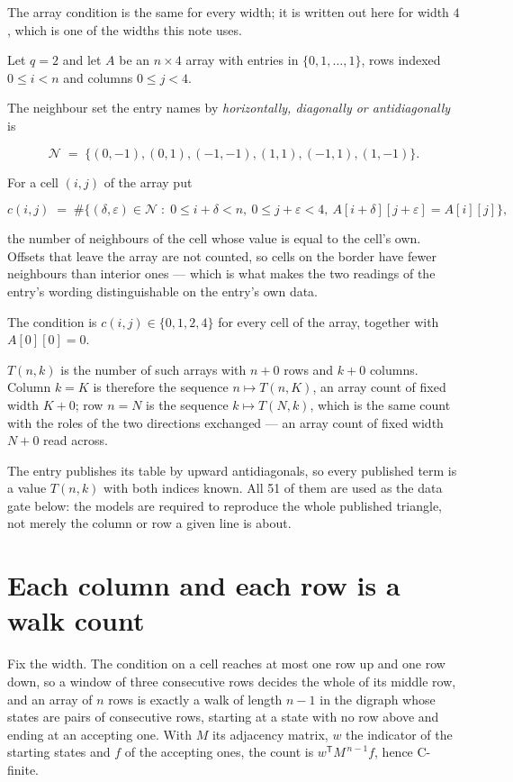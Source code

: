 \documentclass[11pt]{article}
\theoremstyle{definition}
\begin{document}
The array condition is the same for every width; it is written out here for width $4$, which is one of the widths this note uses.

Let $q = 2$ and let $A$ be an $n \times 4$ array with entries in $\{0,1,\dots,1\}$, rows indexed $0 \le i < n$ and columns $0 \le j < 4$.

The neighbour set the entry names by {\itshape horizontally, diagonally or antidiagonally} is

\[\mathcal{N} \;=\; \{(0,-1), (0,1), (-1,-1), (1,1), (-1,1), (1,-1)\}.\]

For a cell $(i,j)$ of the array put

\[c(i,j) \;=\; \#\bigl\{(\delta,\varepsilon)\in\mathcal{N} \;:\; 0\le i+\delta<n,\ 0\le j+\varepsilon<4,\ A[i+\delta][j+\varepsilon] = A[i][j]\bigr\},\]

the number of neighbours of the cell whose value is equal to the cell's own. Offsets that leave the array are not counted, so cells on the border have fewer neighbours than interior ones --- which is what makes the two readings of the entry's wording distinguishable on the entry's own data.

The condition is $c(i,j) \in \{0, 1, 2, 4\}$ for every cell of the array, together with $A[0][0]=0$.

$T(n,k)$ is the number of such arrays with $n + 0$ rows and $k + 0$ columns. Column $k = K$ is therefore the sequence $n \mapsto T(n,K)$, an array count of fixed width $K + 0$; row $n = N$ is the sequence $k \mapsto T(N,k)$, which is the same count with the roles of the two directions exchanged --- an array count of fixed width $N + 0$ read across.

The entry publishes its table by upward antidiagonals, so every published term is a value $T(n,k)$ with both indices known. All 51 of them are used as the data gate below: the models are required to reproduce the whole published triangle, not merely the column or row a given line is about.

\section{Each column and each row is a walk count}

Fix the width. The condition on a cell reaches at most one row up and one row down, so a window of three consecutive rows decides the whole of its middle row, and an array of $n$ rows is exactly a walk of length $n-1$ in the digraph whose states are pairs of consecutive rows, starting at a state with no row above and ending at an accepting one. With $M$ its adjacency matrix, $w$ the indicator of the starting states and $f$ of the accepting ones, the count is $w^{\mathsf T}M^{\,n-1}f$, hence C-finite.
\end{document}
